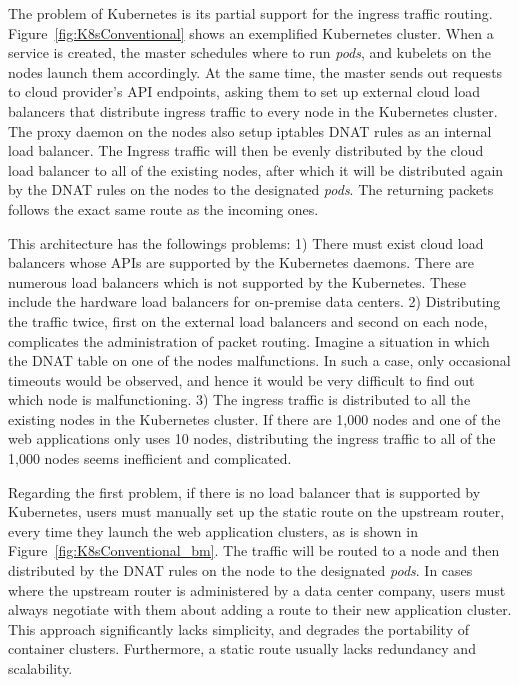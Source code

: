 The problem of Kubernetes is its partial support for the ingress traffic routing.
Figure~\ref{fig:K8sConventional} shows an exemplified Kubernetes cluster.
When a service is created, the master schedules where to run {\em pods}, and kubelets on the nodes launch them accordingly.
At the same time, the master sends out requests to cloud provider's API endpoints, asking them to set up external cloud load balancers that distribute ingress traffic to every node in the Kubernetes cluster.
The proxy daemon on the nodes also setup iptables DNAT \cite{MartinA.Brown2017} rules as an internal load balancer. 
The Ingress traffic will then be evenly distributed by the cloud load balancer to all of the existing nodes, 
after which it will be distributed again by the DNAT rules on the nodes to the designated {\em pods}. 
The returning packets follows the exact same route as the incoming ones.

This architecture has the followings problems: 
1) There must exist cloud load balancers whose APIs are supported by the Kubernetes daemons.
There are numerous load balancers which is not supported by the Kubernetes.
These include the hardware load balancers for on-premise data centers.
2) Distributing the traffic twice, first on the external load balancers and second on each node, complicates the administration of packet routing. 
Imagine a situation in which the DNAT table on one of the nodes malfunctions.
In such a case, only occasional timeouts would be observed, and hence it would be very difficult to find out which node is malfunctioning.   
3) The ingress traffic is distributed to all the existing nodes in the Kubernetes cluster. 
If there are 1,000 nodes and one of the web applications only uses 10 nodes, distributing the ingress traffic to all of the 1,000 nodes seems inefficient and complicated.

Regarding the first problem, if there is no load balancer that is supported by Kubernetes, users must manually set up the static route on the upstream router, every time they launch the web application clusters, as is shown in Figure~\ref{fig:K8sConventional_bm}.
The traffic will be routed to a node and then distributed by the DNAT rules on the node to the designated {\em pods}.
In cases where the upstream router is administered by a data center company, users must always negotiate with them about adding a route to their new application cluster.
This approach significantly lacks simplicity, and degrades the portability of container clusters.
Furthermore, a static route usually lacks redundancy and scalability.

